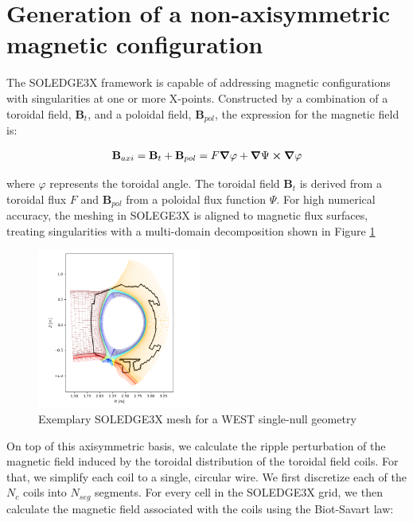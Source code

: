 \section{Generation of a non-axisymmetric magnetic configuration}
\label{sec:rippleCalculation}

The SOLEDGE3X framework is capable of addressing magnetic configurations with singularities at one or more X-points. Constructed by a combination of a toroidal field, $\textbf{B}_t$, and a poloidal field, $\textbf{B}_{pol}$, the expression for the magnetic field is:

\begin{equation}
	\textbf{B}_{axi} = \textbf{B}_t + \textbf{B}_{pol} = F\grad{\varphi} + \grad{\Psi}\cross\grad{\varphi} \label{eq:axiSymBfield}
\end{equation}

where $\varphi$ represents the toroidal angle. The toroidal field $\textbf{B}_t$ is derived from a toroidal flux $F$ and $\textbf{B}_{pol}$ from a poloidal flux function $\Psi$. For high numerical accuracy, the meshing in SOLEGE3X is aligned to magnetic flux surfaces, treating singularities with a multi-domain decomposition shown in Figure \ref{fig:WESTmesh} \newline 

\begin{figure}[H]\centering
	\centering
	\includegraphics[width=0.48\textwidth]{schemes/WESTmesh.png}
	\caption{Exemplary SOLEDGE3X mesh for a WEST single-null geometry }
	\label{fig:WESTmesh}
\end{figure}

On top of this axisymmetric basis, we calculate the ripple perturbation of the magnetic field induced by the toroidal distribution of the toroidal field coils. For that, we simplify each coil to a single, circular wire. We first discretize each of the $N_{c}$ coils into $N_{seg}$ segments. For every cell in the SOLEDGE3X grid, we then calculate the magnetic field associated with the coils using the Biot-Savart law:

